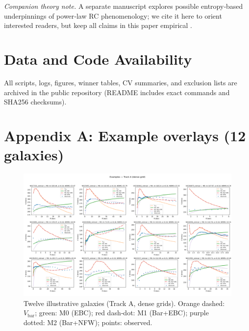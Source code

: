 \documentclass[12pt]{article}
\newcommand{\Vbar}{V_{\mathrm{bar}}}
\begin{document}
\textit{Companion theory note.} A separate manuscript explores possible entropy‑based underpinnings of power‑law RC phenomenology; we cite it here to orient interested readers, but keep all claims in this paper empirical \citep[][submitted]{Tupay2025b}.

\section{Data and Code Availability}
All scripts, logs, figures, winner tables, CV summaries, and exclusion lists are archived in the public repository (README includes exact commands and SHA256 checksums).

\appendix

\section*{Appendix A: Example overlays (12 galaxies)}
\vspace{-0.75em}
\begin{figure}[H]
  \centering
  \includegraphics[width=\linewidth]{figs_m0_examples/trackA_dense_all/galaxy_parade_all.png}
  \caption{Twelve illustrative galaxies (Track A, dense grids). Orange dashed: $\Vbar$; green: M0 (EBC); red dash‑dot: M1 (Bar+EBC); purple dotted: M2 (Bar+NFW); points: observed.}
\end{figure}
\end{document}
